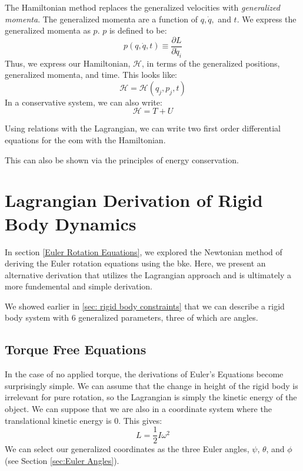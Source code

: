 \documentclass[12pt]{report}
\begin{document}
The Hamiltonian method replaces the generalized velocities with \textit{generalized momenta}. The generalized momenta are a function of $q,\dot{q},$ and $t$. We express the generalized momenta as $p$. $p$ is defined to be:
$$p(q,\dot{q},t)\equiv\frac{\partial L}{\partial \dot{q}_i}$$
Thus, we express our Hamiltonian, $\mathcal{H}$, in terms of the generalized positions, generalized momenta, and time. This looks like:
$$\mathcal{H}=\mathcal{H}(q_j,p_j,t)$$
In a conservative system, we can also write: $$\mathcal{H}=T+U$$

Using relations with the \gls{Lagrangian}, we can write two first order differential equations for the \gls{eom} with the Hamiltonian.





This can also be shown via the principles of energy conservation.



\section{Lagrangian Derivation of Rigid Body Dynamics}

In section \ref{Euler Rotation Equations}, we explored the Newtonian method of deriving the Euler rotation equations using the \gls{bke}. Here, we present an alternative derivation that utilizes the \gls{Lagrangian} approach and is ultimately a more fundemental and simple derivation.

We showed earlier in \ref{sec: rigid body constraints} that we can describe a rigid body system with 6 generalized parameters, three of which are angles.
\subsection{Torque Free Equations}
In the case of no applied torque, the derivations of Euler's Equations become surprisingly simple. We can assume that the change in height of the rigid body is irrelevant for pure rotation, so the \gls{Lagrangian} is simply the kinetic energy of the object. We can suppose that we are also in a coordinate system where the translational kinetic energy is 0. This gives:
\begin{equation}\label{eq:rigid body KE}
L=\frac{1}{2}I\omega^2
\end{equation}
We can select our generalized coordinates as the three Euler angles, $\psi$, $\theta$, and $\phi$ (see Section \ref{sec:Euler Angles}).
\end{document}
